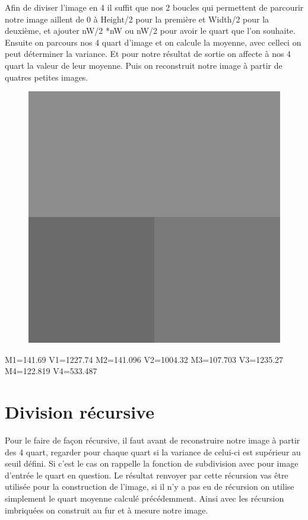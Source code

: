 \documentclass{article}
\begin{document}
Afin de diviser l'image en 4 il suffit que nos 2 boucles qui permettent de parcourir notre image aillent de 0 à Height/2 pour la première et Width/2 pour la deuxième, et ajouter nW/2 *nW ou nW/2 pour avoir le quart que l'on souhaite.
Ensuite on parcours nos 4 quart d'image et on calcule la moyenne, avec celleci on peut déterminer la variance.
Et pour notre résultat de sortie on affecte à nos 4 quart la valeur de leur moyenne.
Puis on reconstruit notre image à partir de quatres petites images.
\begin{figure}[h]
\centerline{\includegraphics[scale=0.5]{./pierrelouisdivisemoyenne.png}}
\caption{}
\end{figure}

M1=141.69 V1=1227.74 M2=141.096 V2=1004.32 M3=107.703 V3=1235.27 M4=122.819 V4=533.487

\newpage
\section{Division récursive}
Pour le faire de façon récursive, il faut avant de reconstruire notre image à partir des 4 quart, regarder pour chaque quart si la variance de celui-ci est supérieur au seuil défini. Si c'est le cas on rappelle la fonction de subdivision avec pour image d'entrée le quart en question. Le résultat renvoyer par cette récursion vas être utilisée pour la construction de l'image, si il n'y a pas eu de récursion on utilise simplement le quart moyenne calculé précédemment.
Ainsi avec les récursion imbriquées on construit au fur et à mesure notre image.
\end{document}
